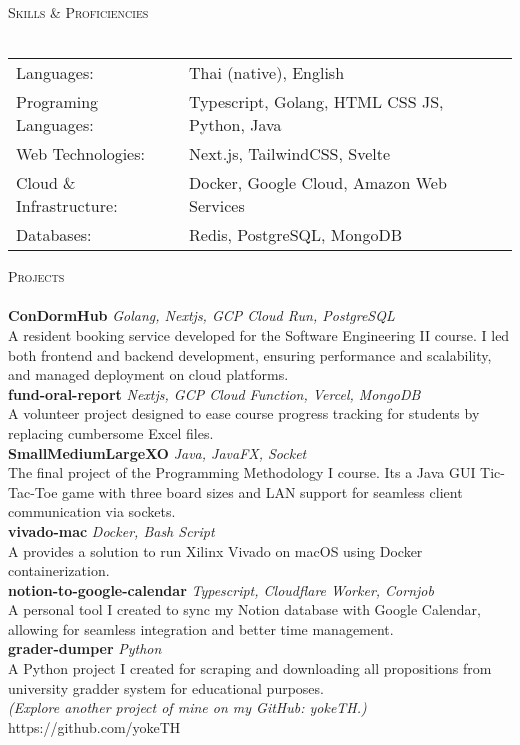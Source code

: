 \documentclass[a4paper]{article}
\newcommand{\lineunder} {
    \vspace*{-8pt} \\
    \hspace*{-18pt} \hrulefill \\
}
\newcommand{\header} [1] {
    {\hspace*{-18pt}\vspace*{6pt} \textsc{#1}}
    \vspace*{-6pt} \lineunder
}
\begin{document}
\header{Skills \& Proficiencies}
\begin{tabular}{ l l }
	Languages:               & Thai (native), English                        \\
	Programing Languages:    & Typescript, Golang, HTML CSS JS, Python, Java \\
	Web Technologies:        & Next.js, TailwindCSS, Svelte                  \\
	Cloud \& Infrastructure: & Docker, Google Cloud, Amazon Web Services     \\
	Databases:               & Redis, PostgreSQL, MongoDB                    \\
\end{tabular}
\vspace{2mm}

\header{Projects}
{\textbf{ConDormHub}} {\sl Golang, Nextjs, GCP Cloud Run, PostgreSQL} \\
A resident booking service developed for the Software Engineering II course. I led both frontend and backend development, ensuring performance and scalability, and managed deployment on cloud platforms.\\
\vspace*{2mm}
{\textbf{fund-oral-report}} {\sl Nextjs, GCP Cloud Function, Vercel, MongoDB} \\
A volunteer project designed to ease course progress tracking for students by replacing cumbersome Excel files.\\
\vspace*{2mm}
{\textbf{SmallMediumLargeXO}} {\sl Java, JavaFX, Socket} \\
The final project of the Programming Methodology I course. It\textquotesingle{}s a Java GUI Tic-Tac-Toe game with three board sizes and LAN support for seamless client communication via sockets.\\
\vspace*{2mm}
{\textbf{vivado-mac}} {\sl Docker, Bash Script} \\
A provides a solution to run Xilinx Vivado on macOS using Docker containerization.\\
\vspace*{2mm}
{\textbf{notion-to-google-calendar}} {\sl Typescript, Cloudflare Worker, Cornjob} \\
A personal tool I created to sync my Notion database with Google Calendar, allowing for seamless integration and better time management.\\
\vspace*{2mm}
{\textbf{grader-dumper}} {\sl Python} \\
A Python project I created for scraping and downloading all propositions from university gradder system for educational purposes.\\
\vspace*{2mm}
{\sl (Explore another project of mine on my GitHub: yokeTH.)} \hfill https://github.com/yokeTH\\

\vspace*{2mm}



\ 
\end{document}
